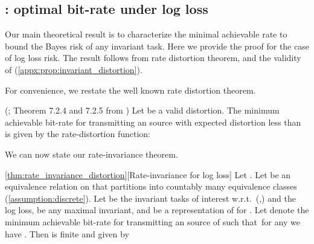 \documentclass[final]{article}
\begin{document}
\subsection{\texorpdfstring{}{Theorem 2}: optimal bit-rate under log loss}
\label{appx:theorem_logloss}

Our main theoretical result is to characterize the minimal achievable rate to bound the Bayes risk of any invariant task.
Here we provide the proof for the case of log loss risk.
The result follows from  rate distortion theorem, and the validity of \disttextinv{}  (\cref{appx:prop:invariant_distortion}).

For convenience, we restate the well known rate distortion theorem. 

\begin{lemma}(\citet{shannon_coding_1959}; Theorem 7.2.4 and 7.2.5 from \citet{berger_rate_1971})\label{lemma:rate_distortion}
Let  be a valid distortion. 
The minimum achievable
bit-rate for transmitting an \iid source  with expected distortion less than  is given by the rate-distortion function:

\end{lemma}

We can now state our rate-invariance theorem.

\begin{manualthm}{\ref{thm:rate_invariance_distortion}}[Rate-invariance for log loss]
Let .
Let  be an equivalence relation on  that partitions  into countably many equivalence classes (\cref{assumption:discrete}).
Let  be the invariant tasks of interest w.r.t.\  (,) and the log loss,  be any maximal invariant, and  be a representation of  for .
Let  denote the minimum achievable bit-rate for transmitting an \iid source of  such that\ for any  we have .
Then   is finite and given by

\end{manualthm}
\end{document}
